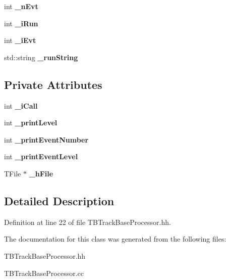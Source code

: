 \begin{DoxyCompactItemize}
\item 
int {\bfseries \-\_\-n\-Evt}\label{classTBTrackBaseProcessor_ac9ffd20b554281d63c4db5f8c16e3426}

\item 
int {\bfseries \-\_\-i\-Run}\label{classTBTrackBaseProcessor_ab91b172b59af005bce84b0b850fa29e6}

\item 
int {\bfseries \-\_\-i\-Evt}\label{classTBTrackBaseProcessor_a1aa277e041851d79b291447597f56fb2}

\item 
std\-::string {\bfseries \-\_\-run\-String}\label{classTBTrackBaseProcessor_a4b5f2e25f41f467972772f2e8cbe90c6}

\end{DoxyCompactItemize}
\subsection*{Private Attributes}
\begin{DoxyCompactItemize}
\item 
int {\bfseries \-\_\-i\-Call}\label{classTBTrackBaseProcessor_a6233e01b6d5f8b6ae13278e26fd2225a}

\item 
int {\bfseries \-\_\-print\-Level}\label{classTBTrackBaseProcessor_a6992548df906f3e9fe087cda782279ac}

\item 
int {\bfseries \-\_\-print\-Event\-Number}\label{classTBTrackBaseProcessor_a9a8f6e7a20da0a4bd9eebbf4989efe32}

\item 
int {\bfseries \-\_\-print\-Event\-Level}\label{classTBTrackBaseProcessor_a6bedefbd3cbed3a851983319c9894ec6}

\item 
T\-File $\ast$ {\bfseries \-\_\-h\-File}\label{classTBTrackBaseProcessor_adcbd4089b530b5af6be4ea277f999e75}

\end{DoxyCompactItemize}


\subsection{Detailed Description}


Definition at line 22 of file T\-B\-Track\-Base\-Processor.\-hh.



The documentation for this class was generated from the following files\-:\begin{DoxyCompactItemize}
\item 
T\-B\-Track\-Base\-Processor.\-hh\item 
T\-B\-Track\-Base\-Processor.\-cc\end{DoxyCompactItemize}
